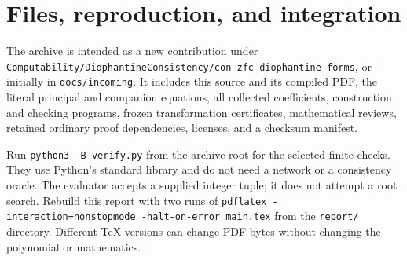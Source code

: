 \documentclass[11pt]{article}
\theoremstyle{definition}
\begin{document}
\section{Files, reproduction, and integration}

The archive is intended as a new contribution under
\nolinkurl{Computability/DiophantineConsistency/con-zfc-diophantine-forms},
or initially in \nolinkurl{docs/incoming}. It includes this source and its
compiled PDF, the literal principal and companion equations, all collected
coefficients, construction and checking programs, frozen transformation
certificates, mathematical reviews, retained ordinary proof dependencies,
licenses, and a checksum manifest.

Run \texttt{python3 -B verify.py} from the archive root for the selected
finite checks. They use Python's standard library and do not need a network
or a consistency oracle. The evaluator accepts a supplied integer tuple;
it does not attempt a root search. Rebuild this report with two runs of
\texttt{pdflatex -interaction=nonstopmode -halt-on-error main.tex}
from the \nolinkurl{report/} directory. Different TeX versions can change
PDF bytes without changing the polynomial or mathematics.
\end{document}
